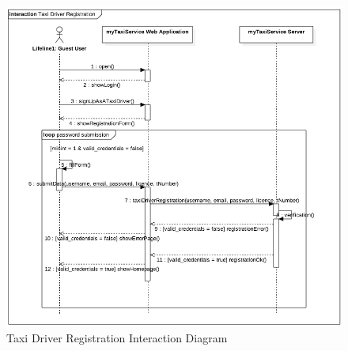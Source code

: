 				\begin{figure}[H]
					\centering
					\includegraphics[width=\textwidth, scale=0.5]{IMG/InteractionDiagrams/TaxiDriverRegistration.png}
					\caption{Taxi Driver Registration Interaction Diagram}\label{sec:FigureTaxiDriverRegistration}
				\end{figure}